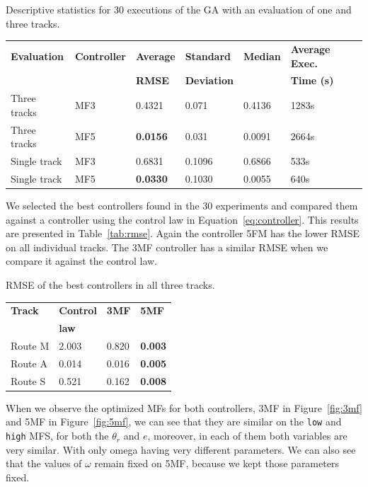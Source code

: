 \documentclass[symmetry,article,submit,moreauthors,pdftex]{Definitions/mdpi}
\begin{document}
\begin{specialtable}[H] 
\small
\caption{Descriptive statistics for 30 executions of the GA with an evaluation
    of one and three tracks.}\label{tab:statistics}
\begin{tabular}{llllll}
\toprule
\textbf{Evaluation} & \textbf{Controller} & \textbf{Average }	& \textbf{Standard } &\textbf{Median}	& \textbf{Average Exec. }\\
                    &                     & \textbf{RMSE}	& \textbf{ Deviation} &\textbf{}	& \textbf{Time (s)}\\
\midrule
Three tracks & MF3 & 0.4321 & 0.071 & 0.4136 & 1283s \\
Three tracks & MF5 & \textbf{0.0156} & 0.031 & 0.0091 & 2664s \\
\midrule
Single track & MF3 & 0.6831 & 0.1096 & 0.6866 & 533s \\
Single track & MF5 & \textbf{0.0330} & 0.1030 & 0.0055 & 640s \\
\bottomrule
\end{tabular}
\end{specialtable}

We selected the best controllers found in the 30 experiments and compared them
against a controller using the control law in Equation~\ref{eq:controller}.
This results are presented in Table~\ref{tab:rmse}. Again the controller 5FM
has the lower RMSE on all individual tracks. The 3MF controller has a similar
RMSE when we compare it against the control law.

\begin{specialtable}[H] 
\small
\caption{RMSE of the best controllers in all three tracks.}\label{tab:rmse}
\begin{tabular}{llll}
\toprule
\textbf{Track}	& \textbf{Control } &\textbf{3MF}	& \textbf{5MF}\\
	& \textbf{law} & & \\
\midrule
Route M & 2.003 & 0.820 & \textbf{0.003} \\
Route A & 0.014 & 0.016 & \textbf{0.005} \\
Route S & 0.521 & 0.162 & \textbf{0.008} \\
\bottomrule
\end{tabular}
\end{specialtable}



When we observe the optimized MFs for both controllers, 3MF in
Figure~\ref{fig:3mf} and 5MF in Figure~\ref{fig:5mf}, we can see that they are
similar on the \texttt{low} and \texttt{high} MFS, for both the $\theta_r$ and
$e$, moreover, in each of them both variables are very similar. With only omega
having very different parameters.  We can also see that the values of $\omega$
remain fixed on 5MF, because we kept those parameters fixed.
\end{document}
